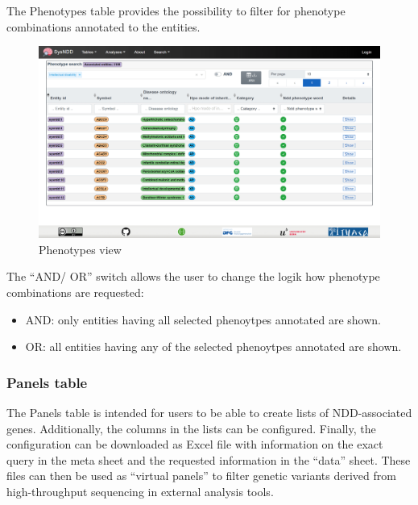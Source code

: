 \documentclass[
]{article}
\providecommand{\tightlist}{%
  \setlength{\itemsep}{0pt}\setlength{\parskip}{0pt}}
\begin{document}
The Phenotypes table provides the possibility to filter for phenotype combinations annotated to the entities.

\begin{figure}
\centering
\includegraphics{./static/img/02_09-sysndd.dbmr.unibe.ch_Phenotypes.png}
\caption{Phenotypes view}
\end{figure}

The ``AND/ OR'' switch allows the user to change the logik how phenotype combinations are requested:

\begin{itemize}
\tightlist
\item
  AND: only entities having all selected phenoytpes annotated are shown.
\item
  OR: all entities having any of the selected phenoytpes annotated are shown.
\end{itemize}

\hypertarget{panels-table}{%
\subsubsection{Panels table}\label{panels-table}}

The Panels table is intended for users to be able to create lists of NDD-associated genes. Additionally, the columns in the lists can be configured.
Finally, the configuration can be downloaded as Excel file with information on the exact query in the meta sheet and the requested information in the ``data'' sheet.
These files can then be used as ``virtual panels'' to filter genetic variants derived from high-throughput sequencing in external analysis tools.
\end{document}
